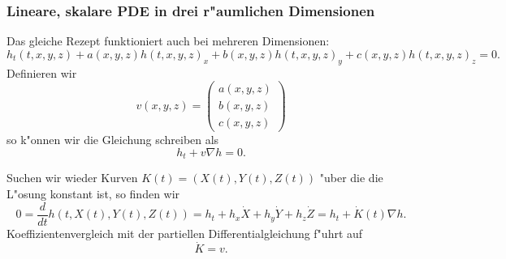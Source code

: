 \subsubsection{Lineare, skalare PDE in drei r"aumlichen Dimensionen}\par
Das gleiche Rezept funktioniert auch bei mehreren Dimensionen:
$$ h_t(t,x,y,z) 
+ a(x,y,z)h(t,x,y,z)_x 
+ b(x,y,z)h(t,x,y,z)_y 
+ c(x,y,z)h(t,x,y,z)_z 
=0.$$
Definieren wir 
$$v(x,y,z)=\left(\begin{array}{c}
a(x,y,z)\\b(x,y,z)\\c(x,y,z)
\end{array}\right)
$$
so k"onnen wir die Gleichung schreiben als
$$ h_t + v\nabla h=0.$$

Suchen wir wieder Kurven $K(t) = (X(t), Y(t), Z(t))$ "uber die die L"osung konstant 
ist, so finden wir
$$ 0 = \frac d {dt} h(t,X(t), Y(t), Z(t)) = h_t+h_x\dot X+h_y \dot Y+h_z \dot Z = h_t + \dot K(t)\nabla h.$$
Koeffizientenvergleich mit der partiellen Differentialgleichung f"uhrt auf
$$ \dot K = v.$$

